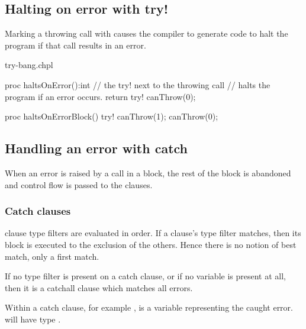 \subsection{Halting on error with try!}
\label{Halting_on_error_with_try_bang}

Marking a throwing call with  causes the compiler to
generate code to halt the program if that call results in an error.

\begin{chapelexample}{try-bang.chpl}
\begin{chapel}
proc haltsOnError():int {
  // the try! next to the throwing call
  // halts the program if an error occurs.
  return try! canThrow(0);
}

proc haltsOnErrorBlock() {
  try! {
    canThrow(1);
    canThrow(0);
  }
}
\end{chapel}
\begin{chapelpost}
\end{chapelpost}
\begin{chapeloutput}
\end{chapeloutput}
\end{chapelexample}

\subsection{Handling an error with catch}
\label{Handling_an_error_with_catch}

When an error is raised by a call in a  block, the rest of the
block is abandoned and control flow is passed to the  clauses.

\subsubsection{Catch clauses}
\label{Catch_clauses}

 clause type filters are evaluated in order. If a 
clause's type filter matches, then its block is executed to the exclusion
of the others. Hence there is no notion of best match, only a first match.

If no type filter is present on a catch clause, or if no variable is
present at all, then it is a catchall clause which matches all errors.

Within a catch clause, for example ,
 is a variable representing the caught error.  will have type
.

